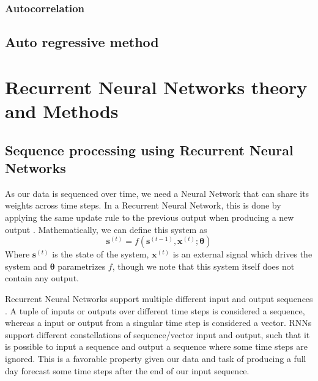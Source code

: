 \documentclass
[twocolumn,
secnumarabic,
nobibnotes,
aps,
prl,
reprint,
groupedaddress,
amsmath,
amssymb,
]{revtex4-2}
\begin{document}
\subsubsection{Autocorrelation}
\subsection{Auto regressive method}


\section{Recurrent Neural Networks theory and Methods}

\subsection{Sequence processing using Recurrent Neural Networks}
As our data is sequenced over time, we need a Neural Network that can share its weights across time steps. In a Recurrent Neural Network, this is done by applying the same update rule to the previous output when producing a new output \cite{Goodfellow2016}. Mathematically, we can define this system as
\begin{equation}
  \nonumber
  \bm{s}^{(t)} = f(\bm{s}^{(t-1)},\bm{x}^{(t)};\bm{\theta})
\end{equation}
Where $\bm{s}^{(t)}$ is the state of the system, $\bm{x}^{(t)}$ is an external signal which drives the system and $\bm{\theta}$ parametrizes $f$, though we note that this system itself does not contain any output. 

Recurrent Neural Networks support multiple different input and output sequences \cite{Geron2019}. A tuple of inputs or outputs over different time steps is considered a sequence, whereas a input or output from a singular time step is considered a vector. RNNs support different constellations of sequence/vector input and output, such that it is possible to input a sequence and output a sequence where some time steps are ignored. This is a favorable property given our data and task of producing a full day forecast some time steps after the end of our input sequence.
\end{document}
